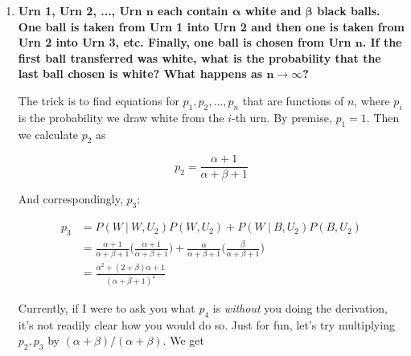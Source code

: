 \documentclass[10pt, oneside]{article}
\begin{document}
\begin{enumerate}[label=3.\arabic*]
\begin{enumerate}
	\begin{proof}
	
	Consider $a_n = \frac{(2n)!}{((n!) 2^{n})^2}$ and $a_{n+1} = \frac{(2(n+1))!}{(((n+1)!) 2^{n+1})^2}$. Then:
	
	\begin{align*}
	\frac{a_{n+1}}{a_n} &= \frac{ (2(n+1))! }{ (((n+1)!) 2^{n+1})^2} \cdot \frac{((n!) 2^{n})^2}{(2n)!} \\
	&= \Bigg( \frac{1}{2(n+1)} \Bigg)^2 \cdot (2n+2)(2n+1) \\
	&= \frac{(2n+2)(2n+1)}{(2n+2)(2n+2)} < 1
	\end{align*}
	
	\end{proof}
	
	\end{enumerate}

\item  \begin{tcolorbox}[
  colback=Cerulean!5!white,
  colframe=Cerulean!75!black]
\textbf{Urn 1, Urn 2, ..., Urn $\bm{n}$ each contain $\bm{\alpha}$ white and $\bm{\beta}$ black balls. One ball is taken from Urn 1 into Urn 2 and then one is taken from Urn 2 into Urn 3, etc. Finally, one ball is chosen from Urn $\bm{n}$. If the first ball transferred was white, what is the probability that the last ball chosen is white? What happens as $\bm{n \rightarrow \infty}$?}
\end{tcolorbox}

The trick is to find equations for $p_1, p_2, ..., p_n$ that are functions of $n$, where $p_i$ is the probability we draw white from the $i$-th urn. By premise, $p_1 = 1$. Then we calculate $p_2$ as

\[ p_2 = \frac{\alpha + 1}{\alpha + \beta + 1} \]

And correspondingly, $p_3$:

\begin{align*}
p_3 &= P(W \ | \ W, U_2) P(W , U_2) + P (W \ | \ B, U_2) P(B, U_2) \\
&= \frac{\alpha + 1}{\alpha + \beta + 1} \bigg( \frac{\alpha+1}{\alpha + \beta + 1} \bigg) + \frac{\alpha}{\alpha + \beta + 1} \bigg( \frac{\beta}{\alpha + \beta + 1} \bigg) \\
&= \frac{\alpha^2 + (2 + \beta)\alpha + 1}{(\alpha + \beta + 1)^2}
\end{align*}

Currently, if I were to ask you what $p_4$ is \textit{without} you doing the derivation, it's not readily clear how you would do so. Just for fun, let's try multiplying $p_2, p_3$ by $(\alpha + \beta) / (\alpha + \beta)$. We get


\end{enumerate}
\end{document}
